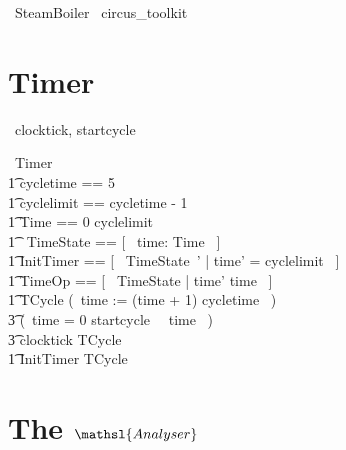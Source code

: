 \documentclass{report} %
\begin{document}
\begin{zsection}
	\SECTION\ SteamBoiler \parents\ circus\_toolkit
\end{zsection}

\chapter{Timer}
\begin{circus}
    \circchannel\ clocktick, startcycle
\end{circus}

\begin{circus}
   \circprocess\ Timer ~\circdef~ \circbegin \\
     \t1 cycletime == 5 \\ %
     \t1 cyclelimit == cycletime - 1 \\ %
     \t1 Time == 0 \upto cyclelimit \\
     \t1 \circstate\ TimeState == [~ time: Time ~] \\ %
     \t1 InitTimer == [~ TimeState~' | time' = cyclelimit ~] \\
     \t1 TimeOp == [~ \Delta TimeState | time' \geq time ~] \\
     \t1 TCycle \circdef (~time := (time + 1) \mod cycletime ~) \circseq \\ %
            \t3 (\circif\ time = 0 \circthen startcycle \then \Skip\ \circelse\ time  \circthen \Skip\ \circfi) \circseq \\ %
            \t3 clocktick \then TCycle
            \\
      \t1 \circspot \lschexpract InitTimer \rschexpract \circseq TCycle \\
   \circend
\end{circus}

\chapter{The $\mathsl{Analyser}$}
\end{document}
